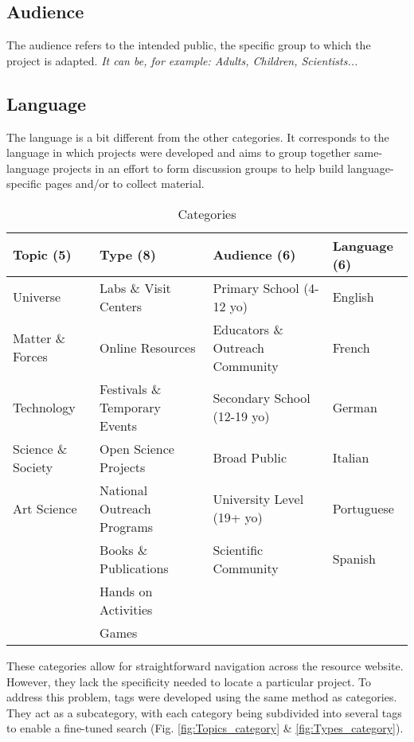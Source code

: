 \subsection*{Audience}
The audience refers to the intended public, the specific group to which the project is adapted.\newline
\textit{It can be, for example: Adults, Children, Scientists...}

\subsection*{Language}
The language is a bit different from the other categories. It corresponds to the language in which projects were developed and aims to group together same-language projects in an effort to form discussion groups to help build language-specific pages and/or to collect material.

\begin{table}[h!]
    \begin{tabular}{|l|l|l|l|}
        \hline
        \textbf{Topic (5)} & \textbf{Type (8)} & \textbf{Audience (6)} & \textbf{Language (6)} \\ \hline
        Universe & Labs \& Visit Centers & Primary School (4-12 yo) & English \\ 
        Matter \& Forces & Online Resources & Educators \& Outreach Community & French \\ 
        Technology & Festivals \& Temporary Events & Secondary School (12-19 yo) & German \\ 
        Science \& Society & Open Science Projects & Broad Public & Italian \\ 
        Art Science & National Outreach Programs & University Level (19+ yo) & Portuguese \\ 
        & Books \& Publications & Scientific Community & Spanish \\ 
        & Hands on Activities &  &  \\ 
        & Games &  &  \\ \hline
    \end{tabular}
    \caption{Categories}
    \label{tab:categories}
\end{table}

\newpage
These categories allow for straightforward navigation across the resource website. However, they lack the specificity needed to locate a particular project. To address this problem, tags were developed using the same method as categories. They act as a subcategory, with each category being subdivided into several tags to enable a fine-tuned search (Fig. \ref{fig:Topics_category} \& \ref{fig:Types_category}). 

